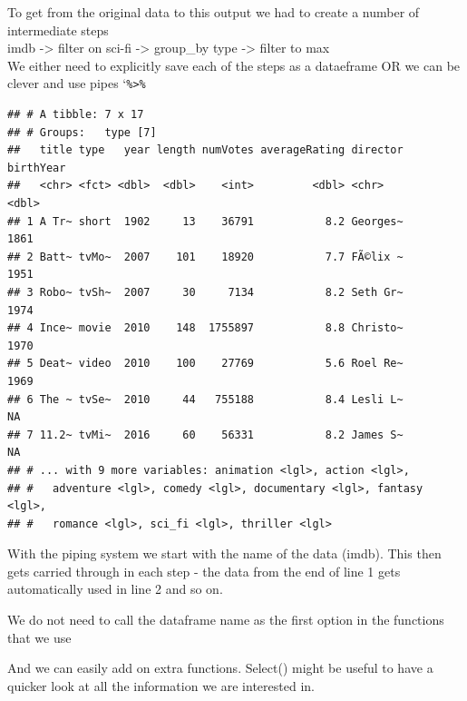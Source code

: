\documentclass[]{book}
\newenvironment{Shaded}{\begin{snugshade}}{\end{snugshade}}
\newcommand{\KeywordTok}[1]{\textcolor[rgb]{0.13,0.29,0.53}{\textbf{#1}}}
\newcommand{\NormalTok}[1]{#1}
\newcommand{\OperatorTok}[1]{\textcolor[rgb]{0.81,0.36,0.00}{\textbf{#1}}}
\newcommand{\StringTok}[1]{\textcolor[rgb]{0.31,0.60,0.02}{#1}}
\begin{document}
To get from the original data to this output we had to create a number of intermediate steps\\
imdb -\textgreater{} filter on sci-fi -\textgreater{} group\_by type -\textgreater{} filter to max\\
We either need to explicitly save each of the steps as a dataeframe OR we can be clever and use pipes `\texttt{\%\textgreater{}\%}

\begin{Shaded}
\end{Shaded}

\begin{verbatim}
## # A tibble: 7 x 17
## # Groups:   type [7]
##   title type   year length numVotes averageRating director birthYear
##   <chr> <fct> <dbl>  <dbl>    <int>         <dbl> <chr>        <dbl>
## 1 A Tr~ short  1902     13    36791           8.2 Georges~      1861
## 2 Batt~ tvMo~  2007    101    18920           7.7 FÃ©lix ~      1951
## 3 Robo~ tvSh~  2007     30     7134           8.2 Seth Gr~      1974
## 4 Ince~ movie  2010    148  1755897           8.8 Christo~      1970
## 5 Deat~ video  2010    100    27769           5.6 Roel Re~      1969
## 6 The ~ tvSe~  2010     44   755188           8.4 Lesli L~        NA
## 7 11.2~ tvMi~  2016     60    56331           8.2 James S~        NA
## # ... with 9 more variables: animation <lgl>, action <lgl>,
## #   adventure <lgl>, comedy <lgl>, documentary <lgl>, fantasy <lgl>,
## #   romance <lgl>, sci_fi <lgl>, thriller <lgl>
\end{verbatim}

With the piping system we start with the name of the data (imdb).
This then gets carried through in each step - the data from the end of line 1 gets automatically used in line 2 and so on.

We do not need to call the dataframe name as the first option in the functions that we use

And we can easily add on extra functions. Select() might be useful to have a quicker look at all the information we are interested in.
\end{document}

